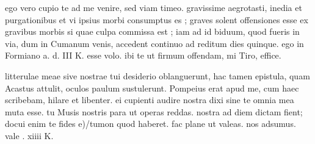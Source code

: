 


 ego vero cupio te ad me venire, sed viam timeo. gravissime aegrotasti, inedia et purgationibus et vi ipsius morbi consumptus es ; graves solent offensiones esse ex gravibus morbis si quae culpa commissa est ; iam ad id biduum, quod fueris in via, dum in Cumanum venis, accedent continuo ad reditum dies quinque. ego in Formiano a. d. III K. esse volo. ibi te ut firmum offendam, mi Tiro, effice.

 litterulae meae sive nostrae tui desiderio oblanguerunt, hac tamen epistula, quam Acastus attulit, oculos paulum sustulerunt. Pompeius erat apud me, cum haec scribebam, hilare et libenter. ei cupienti audire nostra dixi sine te omnia mea muta esse. tu Musis nostris para ut operas reddas. nostra ad diem dictam fient; docui enim te fides e)/tumon quod haberet. fac plane ut valeas. nos adsumus. vale . xiiii K.
